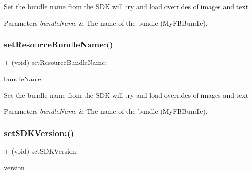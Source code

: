 Set the bundle name from the S\+DK will try and load overrides of images and text


\begin{DoxyParams}{Parameters}
{\em bundle\+Name} & The name of the bundle (My\+F\+B\+Bundle). \\
\hline
\end{DoxyParams}
\mbox{\label{interfaceFBSettings_a60a15470e22d07ad1c7d4a789712e3c1}} 
\subsubsection{\texorpdfstring{set\+Resource\+Bundle\+Name\+:()}{setResourceBundleName:()}\hspace{0.1cm}{\footnotesize\ttfamily [5/5]}}
{\footnotesize\ttfamily + (void) set\+Resource\+Bundle\+Name\+: \begin{DoxyParamCaption}\item[{(N\+S\+String $\ast$)}]{bundle\+Name }\end{DoxyParamCaption}}

Set the bundle name from the S\+DK will try and load overrides of images and text


\begin{DoxyParams}{Parameters}
{\em bundle\+Name} & The name of the bundle (My\+F\+B\+Bundle). \\
\hline
\end{DoxyParams}
\mbox{\label{interfaceFBSettings_afd9810381ac6027e6400879cb68ba46e}} 
\subsubsection{\texorpdfstring{set\+S\+D\+K\+Version\+:()}{setSDKVersion:()}\hspace{0.1cm}{\footnotesize\ttfamily [1/5]}}
{\footnotesize\ttfamily + (void) set\+S\+D\+K\+Version\+: \begin{DoxyParamCaption}\item[{(N\+S\+String $\ast$)}]{version }\end{DoxyParamCaption}}

